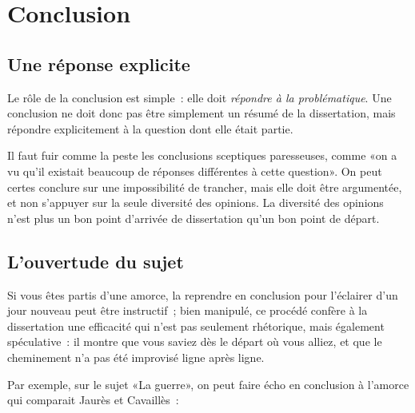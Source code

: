 \documentclass[a4paper,11pt]{article}
\begin{document}
\section{Conclusion}

\subsection{Une réponse explicite}

Le rôle de la conclusion est simple~: elle doit \emph{répondre à la
  problématique}. Une conclusion ne doit donc pas être simplement un
résumé de la dissertation, mais répondre explicitement à la question
dont elle était partie.

\par

Il faut fuir comme la peste les conclusions sceptiques paresseuses,
comme «on a vu qu'il existait beaucoup de réponses différentes à cette
question». On peut certes conclure sur une impossibilité de trancher,
mais elle doit être argumentée, et non s'appuyer sur la seule diversité
des opinions. La diversité des opinions n'est plus un bon point
d'arrivée de dissertation qu'un bon point de départ.

\par

\subsection{L'ouvertude du sujet}

Si vous êtes partis d'une amorce, la reprendre en conclusion pour
l'éclairer d'un jour nouveau peut être instructif~; bien manipulé, ce
procédé confère à la dissertation une efficacité qui n'est pas seulement
rhétorique, mais également spéculative~: il montre que vous saviez dès
le départ où vous alliez, et que le cheminement n'a pas été improvisé
ligne après ligne.

\par

Par exemple, sur le sujet «La guerre», on peut faire écho en conclusion
à l'amorce qui comparait Jaurès et Cavaillès~:
\end{document}
